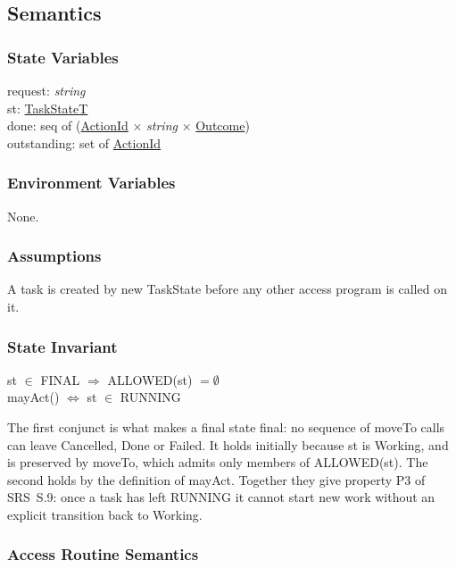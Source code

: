 \documentclass[12pt, titlepage]{article}
\newcommand{\str}{\textit{string}}
\begin{document}
\subsection{Semantics}

\subsubsection{State Variables}

\noindent request: \str\\
st: \hyperref[type:TaskState]{TaskStateT}\\
done: seq of (\hyperref[type:ActionId]{ActionId} $\times$ \str{} $\times$ \hyperref[type:Outcome]{Outcome})\\
outstanding: set of \hyperref[type:ActionId]{ActionId}

\subsubsection{Environment Variables}

None.

\subsubsection{Assumptions}

A task is created by new TaskState before any other access program is called on
it.

\subsubsection{State Invariant}

\noindent st $\in$ FINAL $\Rightarrow$ ALLOWED(st) $= \emptyset$\\
mayAct() $\Leftrightarrow$ st $\in$ RUNNING

\noindent The first conjunct is what makes a final state final: no sequence of
moveTo calls can leave Cancelled, Done or Failed. It holds initially because st
is Working, and is preserved by moveTo, which admits only members of
ALLOWED(st). The second holds by the definition of mayAct. Together they give
property P3 of SRS~S.9: once a task has left RUNNING it cannot start new work
without an explicit transition back to Working.

\subsubsection{Access Routine Semantics}
\end{document}
